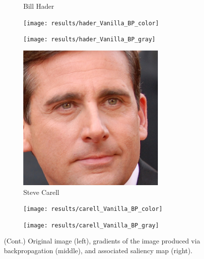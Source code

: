 \documentclass{article}
\begin{document}
\begin{figure}
\begin{subfigure}[t]{0.33\linewidth}
		\caption{Bill Hader}
	\end{subfigure}
	\begin{subfigure}[t]{0.33\linewidth}
		\texttt{[image: results/hader\_Vanilla\_BP\_color]}
	\end{subfigure}
	\begin{subfigure}[t]{0.33\linewidth}
		\texttt{[image: results/hader\_Vanilla\_BP\_gray]}
	\end{subfigure}\vspace{1em}
	\begin{subfigure}[t]{0.33\linewidth}
		\includegraphics[width=\linewidth]{most_carell}
		\caption{Steve Carell}
	\end{subfigure}
	\begin{subfigure}[t]{0.33\linewidth}
		\texttt{[image: results/carell\_Vanilla\_BP\_color]}
	\end{subfigure}
	\begin{subfigure}[t]{0.33\linewidth}
		\texttt{[image: results/carell\_Vanilla\_BP\_gray]}
	\end{subfigure}
	\caption{(Cont.) Original image (left), gradients of the image produced via backpropagation (middle), and associated saliency map (right).}
	\label{fig:vanilla backpropagation}
\end{figure}
\end{document}
